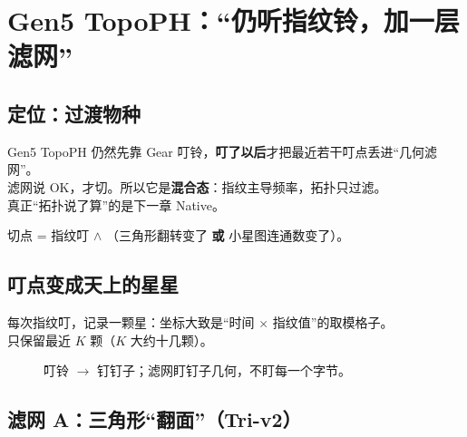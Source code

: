 \chapter{Gen5 TopoPH：``仍听指纹铃，加一层滤网''}
\label{ch:ph-filter}

\section{定位：过渡物种}

\begin{pitfall}[它不是终极形态]
Gen5 TopoPH 仍然先靠 Gear 叮铃，\textbf{叮了以后}才把最近若干叮点丢进``几何滤网''。\\
滤网说 OK，才切。所以它是\textbf{混合态}：指纹主导频率，拓扑只过滤。\\
真正``拓扑说了算''的是下一章 Native。
\end{pitfall}

\begin{keyidea}[TopoPH]
切点 = 指纹叮 $\land$ （三角形翻转变了 \textbf{或} 小星图连通数变了）。
\end{keyidea}

\section{叮点变成天上的星星}

每次指纹叮，记录一颗星：坐标大致是``时间 $\times$ 指纹值''的取模格子。\\
只保留最近 $K$ 颗（$K$ 大约十几颗）。

\begin{figure}[htbp]
\centering
{}
\caption{叮铃 $\to$ 钉钉子；滤网盯钉子几何，不盯每一个字节。}
\label{fig:ph-stars}
\end{figure}

\section{滤网 A：三角形``翻面''（Tri-v2）}

